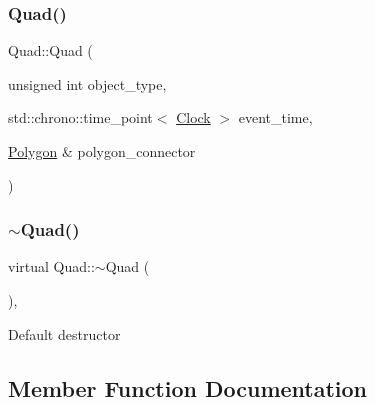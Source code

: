 \subsubsection{\texorpdfstring{Quad()}{Quad()}\hspace{0.1cm}{\footnotesize\ttfamily [4/4]}}
{\footnotesize\ttfamily Quad\+::\+Quad (\begin{DoxyParamCaption}\item[{unsigned int}]{object\+\_\+type,  }\item[{std\+::chrono\+::time\+\_\+point$<$ \mbox{\hyperlink{universe_8h_a0ef8d951d1ca5ab3cfaf7ab4c7a6fd80}{Clock}} $>$}]{event\+\_\+time,  }\item[{\mbox{\hyperlink{classPolygon}{Polygon}} \&}]{polygon\+\_\+connector }\end{DoxyParamCaption})\hspace{0.3cm}{\ttfamily [inline]}}

\mbox{\label{classQuad_a64a53d5b7a7811c34a85054828f74866}} 
\subsubsection{\texorpdfstring{$\sim$\+Quad()}{~Quad()}}
{\footnotesize\ttfamily virtual Quad\+::$\sim$\+Quad (\begin{DoxyParamCaption}{ }\end{DoxyParamCaption})\hspace{0.3cm}{\ttfamily [inline]}, {\ttfamily [virtual]}}

Default destructor 

\subsection{Member Function Documentation}
\mbox{\label{classQuad_a80c2eb7c282e1566c5f7f235611b6206}} 
